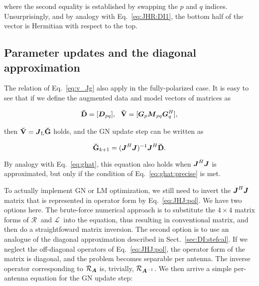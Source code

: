 \documentclass[useAMS,usenatbib]{mn2e}
\newcommand{\mat}[1]{{\bmath{#1}}}
\newcommand{\JJ}{\mat{J}} %
\newcommand{\DD}{\mat{D}}
\newcommand{\MM}{\mat{M}}
\newcommand{\GG}{\mat{G}}
\newcommand{\JHJ}{\JJ^H\JJ} %
\newcommand{\AUGx}[1]{\mathbf{\breve{#1}}}
\newcommand{\GGg}{\AUGx{G}}
\newcommand{\DDd}{\AUGx{D}}
\newcommand{\VVv}{\AUGx{V}}
\newcommand{\LEFT}{\mathrm{L}}
\newcommand{\Rop}[1]{\mathcal{R}_{{#1}}}
\newcommand{\Lop}[1]{\mathcal{L}_{{#1}}}
\numberwithin{equation}{section} %
\providecommand{\DIFadd}[1]{{\protect\color{blue}\uwave{#1}}} %
\providecommand{\DIFaddbegin}{} %
\providecommand{\DIFaddend}{} %
\providecommand{\DIFdelbegin}{} %
\providecommand{\DIFdelend}{} %
\begin{document}
\DIFdelend where the second equality is established by swapping the $p$ and $q$ indices. Unsurprisingly, and by analogy with 
Eq.~\ref{eq:JHR:DI1}, the bottom half of the vector is Hermitian with respect to the top.

\subsection{Parameter updates and the diagonal approximation}

The relation of Eq.~\ref{eq:v_Jg} also apply in the fully-polarized case. It is easy to see that if we define the augmented 
data and model vectors of matrices as
\DIFdelbegin %

\DIFdelend \DIFaddbegin \begin{equation}
\DIFaddend \DDd = [ \DD_{pq} ],~~\VVv = [ \GG_p \MM_{pq} \GG_q^H ],
\DIFdelbegin %
\end{equation}%

\begin{equation}%
\DIFdelend \DIFaddbegin \end{equation}
\DIFaddend then $\VVv = \JJ_\LEFT \GGg$ holds, and the GN update step can be written as
\DIFdelbegin %

\DIFdelend \begin{equation}
\label{eq:ghat:matrix}
\GGg_{k+1} = (\JHJ)^{-1} \JJ^H \DDd.
\end{equation}
\DIFdelbegin %

\DIFdelend By analogy with Eq.~\ref{eq:ghat}, this equation also holds when $\JHJ$ is approximated, but only if the condition of 
Eq.~\ref{eq:ghat:precise} is met.

To actually implement GN or LM optimization, we still need to invert the  $\JHJ$ matrix that is represented in operator form 
by Eq.~\ref{eq:JHJ:pol}. We have two options here. The brute-force numerical approach is to substitute the 
$4\times4$ matrix forms of \DIFaddbegin \DIFadd{the }\DIFaddend $\Rop{~}$ and $\Lop{~}$ \DIFaddbegin \DIFadd{operators (Eqs.~\ref{eq:RA4x4} and \ref{eq:LA4x4}) }\DIFaddend into the 
equation, thus resulting in conventional matrix,
and then do a straightfoward matrix inversion. The second option is to use an analogue of the diagonal 
approximation described in Sect.~\ref{sec:DI:stefcal}. If we neglect the off-diagonal operators of Eq.~\ref{eq:JHJ:pol}, 
the operator form of the matrix is diagonal, and the problem becomes separable per antenna. The inverse operator 
corresponding to $\Rop{\mat{A}}$ is, trivially, $\Rop{\mat{A}^{-1}}$. We then arrive a simple per-antenna equation 
for the GN update step:
\DIFdelbegin %
\end{document}
